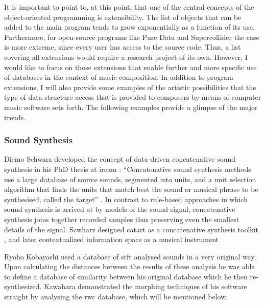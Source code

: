 It is important to point to, at this point, that one of the central concepts of the object-oriented programming is extensibility. The list of objects that can be added to the main program tends to grow exponentially as a function of its use. Furthermore, for open-source programs like Pure Data and Supercollider the case is more extreme, since every user has access to the source code. Thus, a list covering all extensions would require a research project of its own. However, I would like to focus on those extensions that enable further and more specific use of databases in the context of music composition. In addition to program extensions, I will also provide some examples of the artistic possibilities that the type of data structure access that is provided to composers by means of computer music software sets forth. The following examples provide a glimpse of the major trends.

\subsubsection{Sound Synthesis}
\label{applications:synthesis}

Diemo Schwarz developed the concept of data-driven concatenative sound synthesis in his PhD thesis at \gls{ircam} \parencite{Schwarz2000, icmc/bbp2372.2003.099, Sch06:How}: ``Concatenative sound synthesis methods use a large database of source sounds, segmented into units, and a unit selection algorithm that finds the units that match best the sound or musical phrase to be synthesised, called the target'' \parencite{Sch06:How}. In contrast to rule-based approaches in which sound synthesis is arrived at by models of the sound signal, concatenative synthesis joins together recorded samples thus preserving even the smallest details of the signal. Scwharz designed \gls{catart} as a concatenative synthesis toolkit \parencite{Sch06:Rea}, and later contextualized information space as a musical instrument \parencite{Schwarz:2012}

Ryoho Kobayashi \parencite{icmc/bbp2372.2003.052} used a database of \gls{stft} analysed sounds in a very original way. Upon calculating the distances between the results of these analysis he was able to define a database of similarity between his original database which he then re-synthesized. Kawahara \parencite{Kawahara:2004} demonstrated the morphing techniques of his software \gls{straight} \parencite{icmc/bbp2372.1999.411} by analysing the \gls{rwc} database, which will be mentioned below. 

